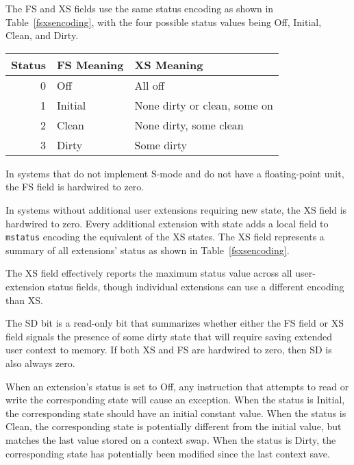 The FS and XS fields use the same status encoding as shown in
Table~\ref{fsxsencoding}, with the four possible status values being
Off, Initial, Clean, and Dirty.

\begin{table*}[h!]
\begin{center}
\begin{tabular}{|r|l|l|}
\hline
Status  & FS Meaning & XS Meaning\\
\hline	 
0 & Off     &  All off \\
1 & Initial &  None dirty or clean, some on\\
2 & Clean   &  None dirty, some clean \\
3 & Dirty   &  Some dirty \\
\hline
\end{tabular}
\end{center}
\caption{Encoding of FS[1:0] and XS[1:0] status fields.}
\label{fsxsencoding}
\end{table*}

In systems that do not implement S-mode and do not have a
floating-point unit, the FS field is hardwired to zero.

In systems without additional user extensions requiring new state, the
XS field is hardwired to zero.  Every additional extension with state
adds a local field to {\tt mstatus} encoding the equivalent of the XS states.
The XS field represents a summary of all
extensions' status as shown in Table~\ref{fsxsencoding}.

\begin{commentary}
The XS field effectively reports the maximum status value across all
user-extension status fields, though individual extensions can use a
different encoding than XS.
\end{commentary}

The SD bit is a read-only bit that summarizes whether either the FS
field or XS field signals the presence of some dirty state that will
require saving extended user context to memory.  If both XS and FS are
hardwired to zero, then SD is also always zero.

When an extension's status is set to Off, any instruction that
attempts to read or write the corresponding state will cause an
exception.  When the status is Initial, the corresponding state should
have an initial constant value.  When the status is Clean, the
corresponding state is potentially different from the initial value,
but matches the last value stored on a context swap.  When the status
is Dirty, the corresponding state has potentially been modified since
the last context save.

